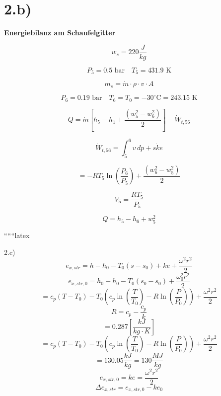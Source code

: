 \section*{2.b)}

\textbf{Energiebilanz am Schaufelgitter}

\[
w_s = 220 \frac{J}{kg}
\]

\[
P_5 = 0.5 \text{ bar} \quad T_5 = 431.9 \text{ K}
\]

\[
m_s = \dot{m} \cdot \rho \cdot v \cdot A
\]

\[
P_6 = 0.19 \text{ bar} \quad T_6 = T_0 = -30^\circ \text{C} = 243.15 \text{ K}
\]

\[
Q = \dot{m} \left[ h_5 - h_1 + \frac{(w_5^2 - w_6^2)}{2} \right] - \dot{W}_{t,56}
\]

\[
\dot{W}_{t,56} = \int_{5}^{6} v \, dp + \dot{ske}
\]

\[
= -RT_5 \ln \left( \frac{P_6}{P_5} \right) + \frac{(w_6^2 - w_5^2)}{2}
\]

\[
V_5 = \frac{RT_5}{P_5}
\]

\[
Q = h_5 - h_6 + w_5^2
\]

``````latex


2.c) \\
\[
e_{x,str} = h - h_0 - T_0(s - s_0) + ke + \frac{\omega^2 r^2}{2}
\]
\[
e_{x,str,0} = h_0 - h_0 - T_0(s_0 - s_0) + \frac{\omega_0^2 r^2}{2}
\]
\[
= c_p (T - T_0) - T_0 \left( c_p \ln \left( \frac{T}{T_0} \right) - R \ln \left( \frac{P}{P_0} \right) \right) + \frac{\omega^2 r^2}{2}
\]
\[
R = c_p - \frac{c_p}{k}
\]
\[
= 0.287 \left[ \frac{kJ}{kg \cdot K} \right]
\]
\[
= c_p \left( T - T_0 \right) - T_0 \left( c_p \ln \left( \frac{T}{T_0} \right) - R \ln \left( \frac{P}{P_0} \right) \right) + \frac{\omega^2 r^2}{2}
\]
\[
= 130.05 \frac{kJ}{kg} = 130 \frac{MJ}{kg}
\]
\[
e_{x,str,0} = ke = \frac{\omega^2 r^2}{2}
\]
\[
\Delta e_{x,str} = e_{x,str,0} - ke_0
\]